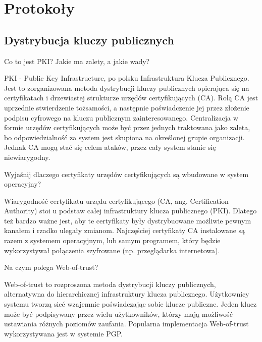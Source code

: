 \documentclass[answers,11pt]{exam}
\begin{document}
\section{Protokoły}

\subsection{Dystrybucja kluczy publicznych}

\begin{questions}

\question Co to jest PKI? Jakie ma zalety, a jakie wady?
\begin{solution}
PKI - Public Key Infrastructure, po polsku Infrastruktura Klucza Publicznego. Jest to zorganizowana metoda dystrybucji kluczy publicznych opierająca się na certyfikatach i drzewiastej strukturze urzędów certyfikujących (CA). Rolą CA jest uprzednie stwierdzenie tożsamości, a następnie poświadczenie jej przez złożenie podpisu cyfrowego na kluczu publicznym zainteresowanego. Centralizacja w formie urzędów certyfikujących może być przez jednych traktowana jako zaleta, bo odpowiedzialność za system jest skupiona na określonej grupie organizacji. Jednak CA mogą stać się celem ataków, przez cały system stanie się niewiarygodny.
\end{solution}

\question Wyjaśnij dlaczego certyfikaty urzędów certyfikujących są wbudowane w system operacyjny?
\begin{solution}
Wiarygodność certyfikatu urzędu certyfikującego (CA, ang. Certification Authority) stoi u podstaw całej infrastruktury klucza publicznego (PKI). Dlatego też bardzo ważne jest, aby te certyfikaty były dystrybuowane możliwie pewnym kanałem i rzadko ulegały zmianom. Najczęściej certyfikaty CA instalowane są razem z systemem operacyjnym, lub samym programem, który będzie wykorzystywał połączenia szyfrowane (np. przeglądarka internetowa).
\end{solution}

\question Na czym polega Web-of-trust?
\begin{solution}
Web-of-trust to rozproszona metoda dystrybucji kluczy publicznych, alternatywna do hierarchicznej infrastruktury klucza publicznego. Użytkownicy systemu tworzą sieć wzajemnie poświadczając sobie klucze publiczne. Jeden klucz może być podpisywany przez wielu użytkowników, którzy mają możliwość ustawiania różnych poziomów zaufania. Popularna implementacja Web-of-trust wykorzystywana jest w systemie PGP.
\end{solution}


\end{questions}
\end{document}
